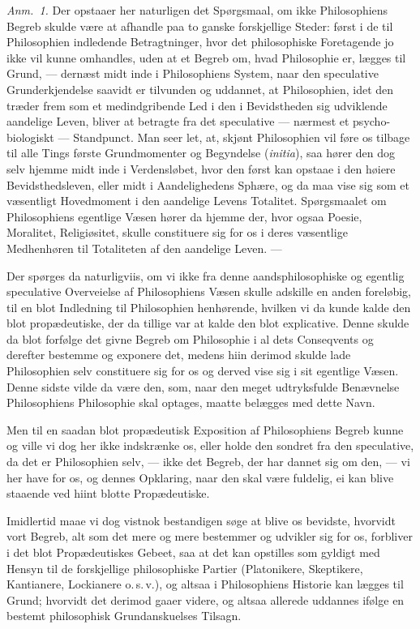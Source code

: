 \documentclass[12pt,a4paper]{book}
\newcommand{\apage}[1]{\marginnote{\footnotesize\textit{[#1]}}}
\begin{document}
{\small\emph{Anm.~1.} Der opstaaer her naturligen det Spørgsmaal, om ikke
Philosophiens Begreb skulde være at afhandle paa to ganske forskjellige
Steder: først i de til Philosophien indledende Betragtninger, hvor det
philosophiske Foretagende jo ikke vil kunne omhandles, uden at et Begreb om,
hvad Philosophie er, lægges til Grund, --- dernæst midt inde i Philosophiens
System, naar den speculative Grunderkjendelse saavidt er tilvunden og uddannet,
at Philosophien, idet den træder frem som et medindgribende Led i den i
Bevidstheden sig udviklende aandelige Leven, bliver at betragte fra det
speculative --- nærmest et psycho-biologiskt --- Standpunct. Man seer let, at,
skjønt Philosophien vil føre os tilbage til alle Tings første Grundmomenter og
Begyndelse (\textit{initia}), saa hører den dog selv hjemme midt inde i
Verdensløbet, hvor den først kan opstaae i den høiere Bevidsthedsleven, eller
midt i Aandelighedens Sphære, og da maa vise sig som et væsentligt Hovedmoment
i den aandelige Levens Totalitet. Spørgsmaalet om Philosophiens egentlige Væsen
hører da hjemme der, hvor ogsaa Poesie, Moralitet, Religiøsitet, skulle
constituere sig for os i deres væsentlige Medhenhøren til Totaliteten af den
aandelige Leven. ---\par} \apage{3} 

{\small Der spørges da naturligviis, om vi ikke fra denne aandsphilosophiske og
egentlig speculative Overveielse af Philosophiens Væsen skulle adskille en
anden foreløbig, til en blot Indledning til Philosophien henhørende, hvilken vi
da kunde kalde den blot propædeutiske, der da tillige var at kalde den blot
explicative. Denne skulde da blot forfølge det givne Begreb om Philosophie i al
dets Conseqvents og derefter bestemme og exponere det, medens hiin derimod
skulde lade Philosophien selv constituere sig for os og derved vise sig i sit
egentlige Væsen. Denne sidste vilde da være den, som, naar den meget
udtryksfulde Benævnelse Philosophiens Philosophie skal optages, maatte belægges
med dette Navn.\par}

{\small Men til en saadan blot propædeutisk Exposition af Philosophiens Begreb
kunne og ville vi dog her ikke indskrænke os, eller holde den sondret fra den
speculative, da det er Philosophien selv, --- ikke det Begreb, der har dannet
sig om den, --- vi her have for os, og dennes Opklaring, naar den skal være
fuldelig, ei kan blive staaende ved hiint blotte Propædeutiske.\par}

{\small Imidlertid maae vi dog vistnok bestandigen søge at blive os bevidste,
hvorvidt vort Begreb, alt som det mere og mere bestemmer og udvikler sig for
os, forbliver i det blot Propædeutiskes Gebeet, saa at det kan opstilles som
gyldigt med Hensyn til de forskjellige philosophiske Partier (Platonikere,
Skeptikere, Kantianere, Lockianere o.\,s.\,v.), og altsaa i Philosophiens
Historie kan lægges til Grund; hvorvidt det derimod gaaer videre, og altsaa
allerede uddannes ifølge en bestemt philosophisk Grundanskuelses Tilsagn.\par}
\end{document}
